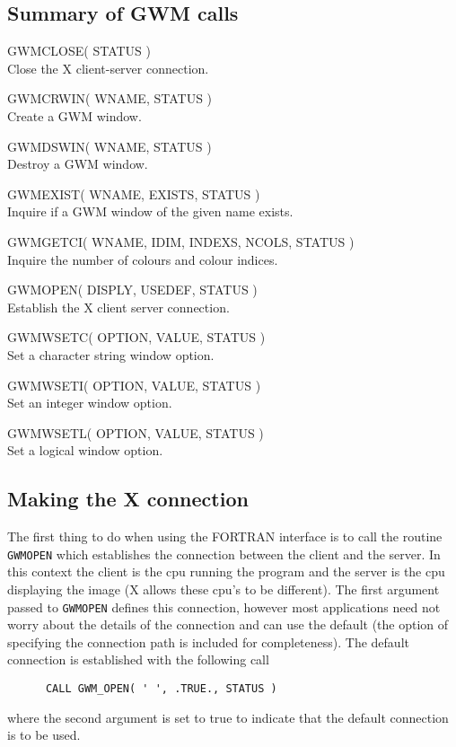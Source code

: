 \documentclass[twoside,11pt]{article}
\newcommand{\htmlref}[2]{#1}
\renewcommand{\_}{\texttt{\symbol{95}}}
\begin{document}
\subsection{Summary of GWM calls}

\newenvironment{routinelist}{\begin{list}{}{\setlength{\leftmargin}{2cm}
                             \setlength{\parsep}{\smallskipamount}}}{\end{list}}
\newcommand{\routine}[2]{\item\hspace{-1cm}\htmlref{#1}{#2}\\}

\begin{routinelist}
\routine{GWM\_CLOSE( STATUS )}{GWM_CLOSE}
   Close the X client-server connection.
\routine{GWM\_CRWIN( WNAME, STATUS )}{GWM_CRWIN}
   Create a GWM window.
\routine{GWM\_DSWIN( WNAME, STATUS )}{GWM_DSWIN}
   Destroy a GWM window.
\routine{GWM\_EXIST( WNAME, EXISTS, STATUS )}{GWM_EXIST}
   Inquire if a GWM window of the given name exists.
\routine{GWM\_GETCI( WNAME, IDIM, INDEXS, NCOLS, STATUS )}{GWM_GETCI}
   Inquire the number of colours and colour indices.
\routine{GWM\_OPEN( DISPLY, USEDEF, STATUS )}{GWM_OPEN}
   Establish the X client server connection.
\routine{GWM\_WSETC( OPTION, VALUE, STATUS )}{GWM_WSETC}
   Set a character string window option.
\routine{GWM\_WSETI( OPTION, VALUE, STATUS )}{GWM_WSETI}
   Set an integer window option.
\routine{GWM\_WSETL( OPTION, VALUE, STATUS )}{GWM_WSETL}
   Set a logical window option.
\end{routinelist}

\subsection{Making the X connection}
The first thing to do when using the FORTRAN interface is to call
the routine \texttt{\htmlref{GWM\_OPEN}{GWM_OPEN}}
which establishes the connection between
the client and the server. In this context the client is the cpu running
the program and the server is the cpu displaying the image (X allows
these cpu's to be different). The first argument passed to {\tt GWM\_OPEN}
defines this connection, however most applications need not worry about
the details of the connection and can use the default (the option of
specifying the connection path is included for completeness). The default
connection is established with the following call
\begin{verbatim}
      CALL GWM_OPEN( ' ', .TRUE., STATUS )
\end{verbatim}
where the second argument is set to true to indicate that the default
connection is to be used.
\end{document}
